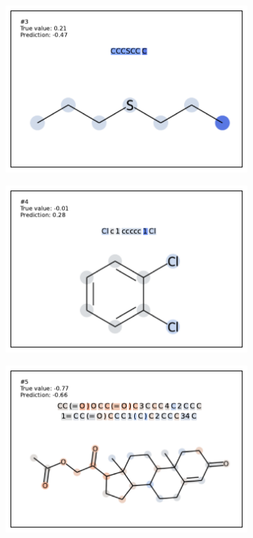 \begin{figure}
\begin{subfigure}[b]{0.33\textwidth}
\end{subfigure}
\begin{subfigure}[b]{0.33\textwidth} 
  \centering 
  \includegraphics[width=\textwidth]{figures/esol/esol3.pdf} 
\end{subfigure}\begin{subfigure}[b]{0.33\textwidth} 
  \centering 
  \includegraphics[width=\textwidth]{figures/esol/esol4.pdf} 
\end{subfigure}\begin{subfigure}[b]{0.33\textwidth} 
  \centering 
  \includegraphics[width=\textwidth]{figures/esol/esol5.pdf} 

\end{subfigure}
\end{figure}
